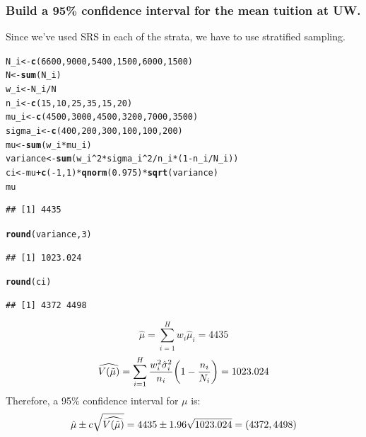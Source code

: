 \documentclass[oneside]{book}\usepackage[]{graphicx}\usepackage[dvipsnames,table,xcdraw]{xcolor}
\makeatletter
\newcommand{\hlnum}[1]{\textcolor[rgb]{0.686,0.059,0.569}{#1}}%
\newcommand{\hlopt}[1]{\textcolor[rgb]{0,0,0}{#1}}%
\newcommand{\hlstd}[1]{\textcolor[rgb]{0.345,0.345,0.345}{#1}}%
\newcommand{\hlkwb}[1]{\textcolor[rgb]{0.69,0.353,0.396}{#1}}%
\newcommand{\hlkwd}[1]{\textcolor[rgb]{0.737,0.353,0.396}{\textbf{#1}}}%
\newenvironment{kframe}{%
 \def\at@end@of@kframe{}%
 \ifinner\ifhmode%
  \def\at@end@of@kframe{\end{minipage}}%
  \begin{minipage}{\columnwidth}%
 \fi\fi%
 \def\FrameCommand##1{\hskip\@totalleftmargin \hskip-\fboxsep
 \colorbox{shadecolor}{##1}\hskip-\fboxsep
     \hskip-\linewidth \hskip-\@totalleftmargin \hskip\columnwidth}%
 \MakeFramed {\advance\hsize-\width
   \@totalleftmargin\z@ \linewidth\hsize
   \@setminipage}}%
 {\par\unskip\endMakeFramed%
 \at@end@of@kframe}
\newenvironment{knitrout}{}{} %
\let\mathbb\relax
\makeatother
\begin{document}
\subsubsection*{Build a 95\% confidence interval for the mean tuition at UW.}
Since we've used SRS in each of the strata, we have to use stratified sampling.
\begin{knitrout}
\color{fgcolor}\begin{kframe}
\begin{alltt}
\hlstd{N_i} \hlkwb{<-} \hlkwd{c}\hlstd{(}\hlnum{6600}\hlstd{,} \hlnum{9000}\hlstd{,} \hlnum{5400}\hlstd{,} \hlnum{1500}\hlstd{,} \hlnum{6000}\hlstd{,} \hlnum{1500}\hlstd{)}
\hlstd{N} \hlkwb{<-} \hlkwd{sum}\hlstd{(N_i)}
\hlstd{w_i} \hlkwb{<-} \hlstd{N_i}\hlopt{/}\hlstd{N}
\hlstd{n_i} \hlkwb{<-} \hlkwd{c}\hlstd{(}\hlnum{15}\hlstd{,} \hlnum{10}\hlstd{,} \hlnum{25}\hlstd{,} \hlnum{35}\hlstd{,} \hlnum{15}\hlstd{,} \hlnum{20}\hlstd{)}
\hlstd{mu_i} \hlkwb{<-} \hlkwd{c}\hlstd{(}\hlnum{4500}\hlstd{,} \hlnum{3000}\hlstd{,} \hlnum{4500}\hlstd{,} \hlnum{3200}\hlstd{,} \hlnum{7000}\hlstd{,} \hlnum{3500}\hlstd{)}
\hlstd{sigma_i} \hlkwb{<-} \hlkwd{c}\hlstd{(}\hlnum{400}\hlstd{,} \hlnum{200}\hlstd{,} \hlnum{300}\hlstd{,} \hlnum{100}\hlstd{,} \hlnum{100}\hlstd{,} \hlnum{200}\hlstd{)}
\hlstd{mu} \hlkwb{<-} \hlkwd{sum}\hlstd{(w_i} \hlopt{*} \hlstd{mu_i)}
\hlstd{variance} \hlkwb{<-} \hlkwd{sum}\hlstd{(w_i}\hlopt{^}\hlnum{2} \hlopt{*} \hlstd{sigma_i}\hlopt{^}\hlnum{2}\hlopt{/}\hlstd{n_i} \hlopt{*} \hlstd{(}\hlnum{1} \hlopt{-} \hlstd{n_i}\hlopt{/}\hlstd{N_i))}
\hlstd{ci} \hlkwb{<-} \hlstd{mu} \hlopt{+} \hlkwd{c}\hlstd{(}\hlopt{-}\hlnum{1}\hlstd{,} \hlnum{1}\hlstd{)} \hlopt{*} \hlkwd{qnorm}\hlstd{(}\hlnum{0.975}\hlstd{)} \hlopt{*} \hlkwd{sqrt}\hlstd{(variance)}
\hlstd{mu}
\end{alltt}
\begin{verbatim}
## [1] 4435
\end{verbatim}
\begin{alltt}
\hlkwd{round}\hlstd{(variance,} \hlnum{3}\hlstd{)}
\end{alltt}
\begin{verbatim}
## [1] 1023.024
\end{verbatim}
\begin{alltt}
\hlkwd{round}\hlstd{(ci)}
\end{alltt}
\begin{verbatim}
## [1] 4372 4498
\end{verbatim}
\end{kframe}
\end{knitrout}
\[ \hat{\mu}=\sum_{i=1}^H w_i \hat{\mu}_i=4435 \]
\[ \widehat{\mathbb{V}(\tilde{\mu})}=\sum_{i=1}^{H} \frac{w_i^2\hat{\sigma}_i^2}{n_i}\biggl(1-\frac{n_i}{N_i} \biggr)=1023.024 \]
Therefore, a 95\% confidence interval for $\mu$ is:
\[ \hat{\mu}\pm c\sqrt{\widehat{\mathbb{V}(\tilde{\mu})}}=4435\pm 1.96\sqrt{1023.024}=(4372, 4498) \]
\end{document}
